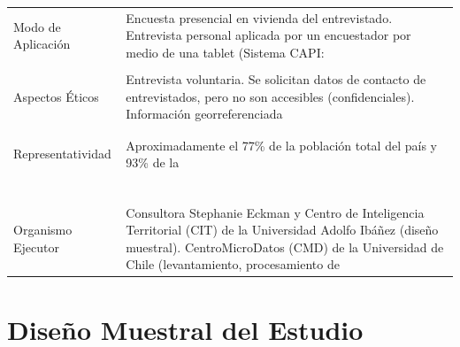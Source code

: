 \documentclass[
]{book}
\begin{document}
\begin{table}
\begin{tabular}[t]{>{\raggedright\arraybackslash}p{5cm}>{\raggedright\arraybackslash}p{15cm}}
Modo de Aplicación & Encuesta presencial en vivienda del entrevistado. Entrevista personal
            aplicada por un encuestador por medio de una tablet (Sistema CAPI:
\cellcolor{white}{            Computer Assisted Personal Interview.)}\\
\cellcolor{white}{Informante} & \cellcolor{white}{Hombre o mujer residente en la vivienda, con edad entre 18 y 75 años.}\\
Aspectos Éticos & Entrevista voluntaria. Se solicitan datos de contacto de entrevistados,
            pero no son accesibles (confidenciales). Información georreferenciada
\cellcolor{white}{            también se reserva de manera confidencial. Base de acceso público.}\\
\cellcolor{white}{Duración Promedio} & \cellcolor{white}{55 minutos.}\\
\addlinespace
\cellcolor{white}{Control de Calidad} & \cellcolor{white}{Supervisión interna de 20\% de la muestra lograda.}\\
Representatividad & Aproximadamente el 77\% de la población total del país y 93\% de la
\cellcolor{white}{              población urbana.}\\
\cellcolor{white}{Tasa de Respuesta} & \cellcolor{white}{62.0\% (RR1)}\\
\cellcolor{white}{Tasa de Cooperación} & \cellcolor{white}{85.8\% (COOP1)}\\
\cellcolor{white}{Tasa de Rechazo} & \cellcolor{white}{9.0\% (REF1)}\\
\addlinespace
\cellcolor{white}{Tasa de Contacto} & \cellcolor{white}{72.2\% (CON1)}\\
\cellcolor{white}{Tamaño Muestral} & \cellcolor{white}{3025 encuestas hechas, 2927 individuos en base de datos definitiva.}\\
\cellcolor{white}{Organismo Responsable} & \cellcolor{white}{Centro de Estudios del Conflicto y Cohesión Social (COES).}\\
Organismo Ejecutor & Consultora Stephanie Eckman y Centro de Inteligencia Territorial (CIT)
            de la Universidad Adolfo Ibáñez (diseño muestral). CentroMicroDatos
            (CMD) de la Universidad de Chile (levantamiento, procesamiento de
\cellcolor{white}{            la información y construcción de factores de expansión).}\\
\bottomrule
\end{tabular}
\end{table}

\hypertarget{diseuxf1o-muestral-del-estudio}{%
\chapter{Diseño Muestral del Estudio}\label{diseuxf1o-muestral-del-estudio}}
\end{document}
